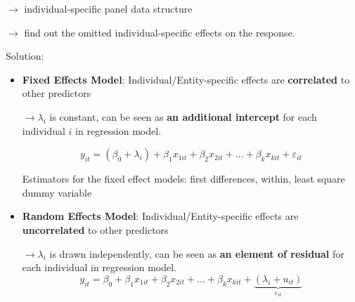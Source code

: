 \begin{itemize}
	$\rightarrow$ individual-specific panel data structure
	
	$\rightarrow$ find out the omitted individual-specific effects on the response.
	
	Solution:
	\begin{itemize}
		\item \textbf{Fixed Effects Model}: 
		Individual/Entity-specific effects are \textbf{correlated} to other predictors
		
		$\rightarrow \lambda_i$ is constant, can be seen as \textbf{an additional intercept} for each individual $i$ in regression model. 
		
		$$y_{it} = (\beta_0 + \lambda_i) + \beta_1 x_{1it} + \beta_2 x_{2it} + \dots + \beta_k x_{kit} + \varepsilon_{it}$$
		
		Estimators for the fixed effect models: first differences, within, least square dummy variable
		\item \textbf{Random Effects Model}: 
		Individual/Entity-specific effects are \textbf{uncorrelated} to other predictors
		
		$\rightarrow \lambda_i$ is drawn independently, can be seen as \textbf{an element of residual} for each individual in regression model.
		$$y_{it} = \beta_0 + \beta_1 x_{1it} + \beta_2 x_{2it} + \dots + \beta_k x_{kit} + \underbrace{(\lambda_i + u_{it})}_{\varepsilon_{it}}$$	
	\end{itemize} 
\end{itemize}


